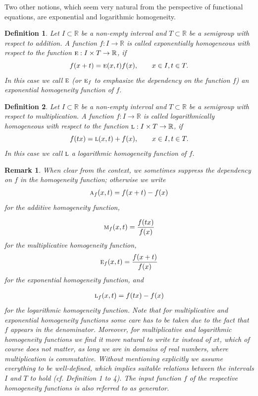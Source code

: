\documentclass{amsart}
\theoremstyle{plain}
\newtheorem{definition}{Definition}
\newtheorem{remark}{Remark}
\numberwithin{equation}{section}
\newcommand{\term}[1]{\textit{#1}}
\newcommand{\eh}{\textsc{e}}
\newcommand{\R}{{\mathbb{R}}}
\begin{document}
Two other notions, which seem very natural from the perspective of functional equations,
are exponential and logarithmic homogeneity.

\begin{definition}
Let $I \subset \R$ be a non-empty interval and $T \subset \R$ be a semigroup with respect to addition.
A function $f: I \to \R$ is called \textit{exponentially homogeneous} with respect to the function $\eh: I \times T \to \R$, if
%
\begin{equation*}
f(x+t)=\eh(x,t) f(x), \qquad x \in I, t \in T.
\end{equation*}
In this case we call $\eh$ (or $\eh_f$ to emphasize the dependency on the function $f$) an exponential homogeneity function of $f$.
\end{definition}


\begin{definition}
Let $I \subset \R$ be a non-empty interval and $T \subset \R$ be a semigroup with respect to multiplication.
A function $f: I \to \R$ is called \textit{logarithmically homogeneous} with respect to the function $\textsc{l}: I \times T \to \R$, if
\begin{equation*}
f(tx)=\textsc{l}(x,t) + f(x), \qquad x \in I, t \in T.
\end{equation*}
In this case we call $\textsc{l}$ a logarithmic homogeneity function of $f$.
\end{definition}

\begin{remark}
When clear from the context, we sometimes suppress 
the dependency on $f$ in the homogeneity function; otherwise we write
\begin{align*}
\textsc{a}_{f} (x,t)=f(x+t) - f(x)
\end{align*}	
for the \textit{additive homogeneity function},

\begin{align*}
	\textsc{m}_{f} (x,t)=\frac{f(tx)}{f(x)}  
\end{align*}	
for the \textit{multiplicative homogeneity function},
\begin{align*}
	\eh_{f} (x,t)=\frac{f(x+t)}{f(x)}  
\end{align*}	
for the \textit{exponential homogeneity function}, and

\begin{align*}
	\textsc{l}_{f} (x,t)=f(tx)-f(x)  	
\end{align*}	
for the \textit{logarithmic homogeneity function}.
Note that for multiplicative and exponential homogeneity functions some care has to be taken due to the fact that $f$ appears in the denominator.
Moreover, for multiplicative and logarithmic homogeneity functions we find it more natural to write $tx$ instead of $xt$, which of course does not matter, as long we are in domains of real numbers, where multiplication is commutative. 
Without mentioning explicitly we assume
everything to be well-defined, 
which implies suitable relations between the intervals $I$ and $T$ to hold (cf. Definition 1 to 4).
The input function $f$ of the respective homogeneity functions is also referred to as \term{generator}.
\end{remark}
\end{document}
